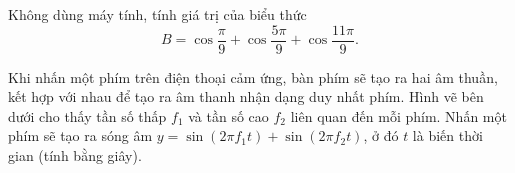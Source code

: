 \begin{bt}%
	Không dùng máy tính, tính giá trị của biểu thức
	$$
	B=\cos \dfrac{\pi}{9}+\cos \dfrac{5 \pi}{9}+\cos \dfrac{11 \pi}{9} .
	$$
\end{bt}

\begin{bt}%
	Khi nhấn một phím trên điện thoại cảm ứng, bàn phím sẽ tạo ra hai âm thuần, kết hợp với nhau để tạo ra âm thanh nhận dạng duy nhất phím. Hình vẽ bên dưới cho thấy tần số thấp $f_1$ và tần số cao $f_2$ liên quan đến mỗi phím. Nhấn một phím sẽ tạo ra sóng âm $y=\sin \left(2 \pi f_1 t\right)+\sin \left(2 \pi f_2 t\right)$, ở đó $t$ là biến thời gian (tính bằng giây).
	\begin{center}
		\begin{tikzpicture}[scale=1.3,>=stealth, font=\footnotesize, line join=round, line cap=round]
			

\end{tikzpicture}
\end{center}
\end{bt}
